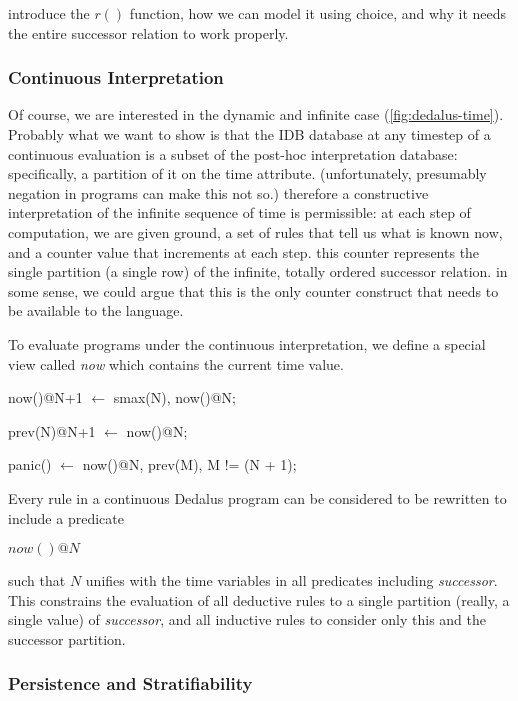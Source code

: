 introduce the $r()$ function, how we can model it using choice, and why it needs the entire successor relation to work properly.



\subsubsection{Continuous Interpretation}

Of course, we are interested in the dynamic and infinite case (\ref{fig:dedalus-time}).
Probably what we want to show is that the IDB database at any timestep of a continuous evaluation is a subset
of the post-hoc interpretation database: specifically, a partition of it on the time attribute.  (unfortunately, presumably
negation in programs can make this not so.)  therefore a constructive interpretation of the infinite sequence of time is permissible:
at each step of computation, we are given ground, a set of rules that tell us what is known now, and a counter value that increments
at each step.  this counter represents the single partition (a single row) of the infinite, totally ordered successor relation.
in some sense, we could argue that this is the only counter construct that needs to be available to the language.

To evaluate programs under the continuous interpretation, we define a special view called \emph{now} which contains the current 
time value.

\begin{Dedalus}
now()@N+1  \(\leftarrow\)
    smax(N),
    now()@N;

prev(N)@N+1  \(\leftarrow\)
    now()@N;

panic()  \(\leftarrow\)
    now()@N,
    prev(M),
    M != (N + 1);
\end{Dedalus}

Every rule in a continuous Dedalus program can be considered to be rewritten to include a predicate

$now()@N$

such that $N$ unifies with the time variables in all predicates including \emph{successor}.  This constrains the evaluation of all deductive 
rules to a single partition (really, a single value) of \emph{successor}, and all inductive rules to consider only this and the successor partition.

\subsubsection{Persistence and Stratifiability}


